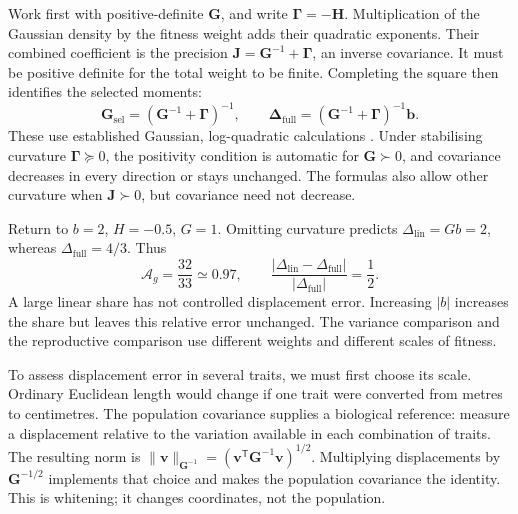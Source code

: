 Work first with positive-definite $\mathbf G$, and write
$\boldsymbol\Gamma=-\mathbf H$. Multiplication of the Gaussian
density by the fitness weight adds their quadratic exponents. Their
combined coefficient is the precision
$\mathbf J=\mathbf G^{-1}+\boldsymbol\Gamma$, an inverse covariance.
It must be positive definite for the total weight to be finite. Completing
the square then identifies the selected moments:
\begin{equation}
 \mathbf G_{\mathrm{sel}}
    =(\mathbf G^{-1}+\boldsymbol\Gamma)^{-1},
 \qquad
 \boldsymbol\Delta_{\mathrm{full}}
    =(\mathbf G^{-1}+\boldsymbol\Gamma)^{-1}\mathbf b.
 \label{companion:eq:selected}
\end{equation}
These use established Gaussian, log-quadratic calculations
\citep{MorrisseyGoudie2022}. Under stabilising curvature
$\boldsymbol\Gamma\succeq0$, the positivity condition is automatic for
$\mathbf G\succ0$, and covariance decreases in every direction or stays
unchanged. The formulas also allow other curvature when $\mathbf J\succ0$,
but covariance need not decrease.

Return to $b=2$, $H=-0.5$, $G=1$. Omitting curvature predicts
$\Delta_{\mathrm{lin}}=Gb=2$, whereas
$\Delta_{\mathrm{full}}=4/3$. Thus
\begin{equation}
 \mathcal A_g=\frac{32}{33}\simeq0.97,
 \qquad
 \frac{|\Delta_{\mathrm{lin}}-\Delta_{\mathrm{full}}|}
      {|\Delta_{\mathrm{full}}|}=\frac12.
 \label{companion:eq:example}
\end{equation}
A large linear share has not controlled displacement error. Increasing
$|b|$ increases the share but leaves this relative error unchanged. The
variance comparison and the reproductive comparison use different weights
and different scales of fitness.

To assess displacement error in several traits, we must first choose its
scale. Ordinary Euclidean length would change if one trait were converted
from metres to centimetres. The population covariance supplies a biological
reference: measure a displacement relative to the variation available in
each combination of traits. The resulting norm is
$\|\mathbf v\|_{\mathbf G^{-1}}
=(\mathbf v^{\mathsf T}\mathbf G^{-1}\mathbf v)^{1/2}$.
Multiplying displacements by $\mathbf G^{-1/2}$ implements that choice and
makes the population covariance the identity. This is whitening; it changes
coordinates, not the population.

